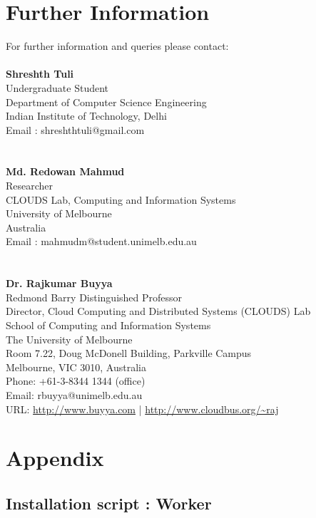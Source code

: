 \documentclass{article}
\begin{document}
\newpage

\section{Further Information}

For further information and queries please contact:
\\ \\
\textbf{Shreshth Tuli}\\  
Undergraduate Student \\
Department of Computer Science Engineering \\
Indian Institute of Technology, Delhi \\
Email : shreshthtuli@gmail.com \\
\\ \\
\textbf{Md. Redowan Mahmud} \\
Researcher\\
CLOUDS Lab, Computing and Information Systems\\
University of Melbourne\\
Australia\\
Email : mahmudm@student.unimelb.edu.au \\
\\ \\
\textbf{Dr. Rajkumar Buyya}\\
Redmond Barry Distinguished Professor \\
Director, Cloud Computing and Distributed Systems (CLOUDS) Lab\\
School of Computing and Information Systems\\
The University of Melbourne\\
Room 7.22, Doug McDonell Building, Parkville Campus\\
Melbourne, VIC 3010, Australia\\
Phone: +61-3-8344 1344 (office)\\
Email: rbuyya@unimelb.edu.au \\
URL: \url{http://www.buyya.com} | \url{http://www.cloudbus.org/~raj}

\newpage

\section*{Appendix}

\subsection*{Installation script : Worker}
\end{document}
